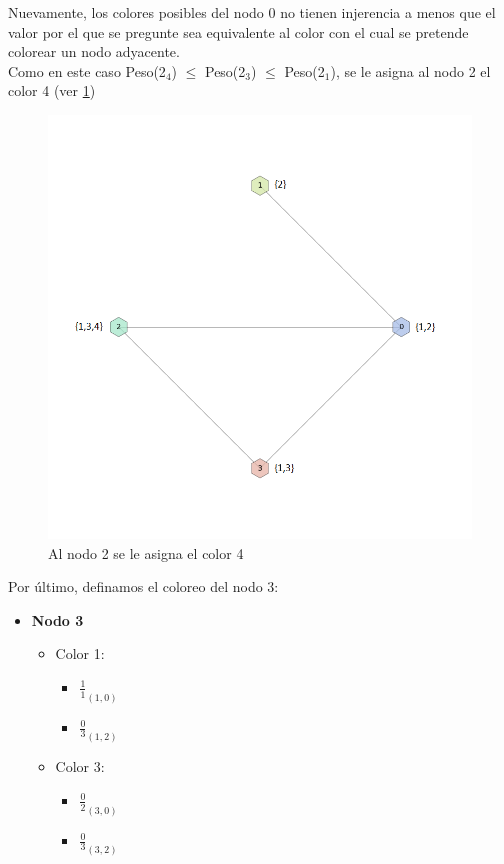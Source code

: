 Nuevamente, los colores posibles del nodo 0 no tienen injerencia a menos que el valor por el que se pregunte sea equivalente al color con el cual se pretende colorear un nodo adyacente.\\
Como en este caso  Peso(2$_{4}$) $\leq$  Peso(2$_{3}$)  $\leq$  Peso(2$_{1}$), se le asigna al nodo 2 el color 4 (ver \ref{3colores})

 \begin{figure}[H]
    \begin{center}
  	\includegraphics[width=13cm]{imagenes/Ej3/4Nodos3.png}
 	\caption{Al nodo 2 se le asigna el color 4}
 	\label{3colores}
    \end{center}
  \end{figure}

Por último, definamos el coloreo del nodo 3:\\

\begin{itemize}
	\item \textbf{Nodo 3}
	\begin{itemize}
		\item Color 1:
		\begin{itemize}
			\item  $\frac{1}{1}_{(1,0)}$
			\item  $\frac{0}{3}_{(1,2)}$
		\end{itemize}

		\item Color 3:
		\begin{itemize}
			\item  $\frac{0}{2}_{(3,0)}$
			\item  $\frac{0}{3}_{(3,2)}$
		\end{itemize}
	\end{itemize}
\end{itemize}

